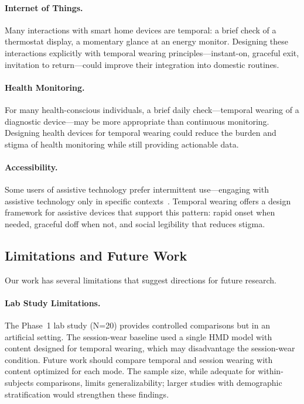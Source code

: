 \paragraph{Internet of Things.}
Many interactions with smart home devices are temporal: a brief check of a thermostat display, a momentary glance at an energy monitor. Designing these interactions explicitly with temporal wearing principles---instant-on, graceful exit, invitation to return---could improve their integration into domestic routines.

\paragraph{Health Monitoring.}
For many health-conscious individuals, a brief daily check---temporal wearing of a diagnostic device---may be more appropriate than continuous monitoring. Designing health devices for temporal wearing could reduce the burden and stigma of health monitoring while still providing actionable data.

\paragraph{Accessibility.}
Some users of assistive technology prefer intermittent use---engaging with assistive technology only in specific contexts~\cite{profita2016acceptability}. Temporal wearing offers a design framework for assistive devices that support this pattern: rapid onset when needed, graceful doff when not, and social legibility that reduces stigma.

\subsection{Limitations and Future Work}

Our work has several limitations that suggest directions for future research.

\paragraph{Lab Study Limitations.}
The Phase~1 lab study (N=20) provides controlled comparisons but in an artificial setting. The session-wear baseline used a single HMD model with content designed for temporal wearing, which may disadvantage the session-wear condition. Future work should compare temporal and session wearing with content optimized for each mode. The sample size, while adequate for within-subjects comparisons, limits generalizability; larger studies with demographic stratification would strengthen these findings.

